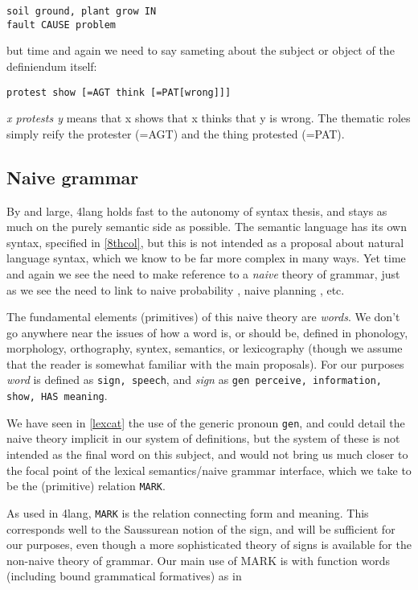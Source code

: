\documentclass[11pt,bookmarks,bookmarksnumbered,naturalnames,plainpages=false,pdftex,colorlinks=true,urlcolor=blue,bookmarksdepth=subsection,plainpages=false]{paper}
\begin{document}
\begin{verbatim}
soil ground, plant grow IN
fault CAUSE problem
\end{verbatim}

\noindent
but time and again we need to say sameting about the subject or object of the
definiendum itself: 

\begin{verbatim}
protest show [=AGT think [=PAT[wrong]]]
\end{verbatim}

\noindent
{\it x protests y} means that x shows that x thinks that y is wrong. The
thematic roles simply reify the protester (=AGT) and the thing protested
(=PAT). 

\subsection{Naive grammar}\label{naivegrammar}

By and large, 4lang holds fast to the autonomy of syntax thesis, and stays as
much on the purely semantic side as possible. The semantic language has its
own syntax, specified in \ref{8thcol}, but this is not intended as a proposal
about natural language syntax, which we know to be far more complex in many
ways. Yet time and again we see the need to make reference to a {\it naive}
theory of grammar, just as we see the need to link to naive probability
\citep{Gyenis:2019}, naive planning \citep{Gordon:2017}, etc. 

The fundamental elements (primitives) of this naive theory are {\it words}. We
don't go anywhere near the issues of how a word is, or should be, defined in
phonology, morphology, orthography, syntex, semantics, or lexicography (though
we assume that the reader is somewhat familiar with the main proposals). For
our purposes {\it word} is defined as {\tt sign, speech}, and {\it sign} as
{\tt gen perceive, information, show, HAS meaning}.

We have seen in \ref{lexcat} the use of the generic pronoun {\tt gen}, and
could detail the naive theory implicit in our system of definitions, but the
system of these is not intended as the final word on this subject, and would
not bring us much closer to the focal point of the lexical semantics/naive
grammar interface, which we take to be the (primitive) relation {\tt MARK}.

As used in 4lang, {\tt MARK} is the relation connecting form and meaning. This
corresponds well to the Saussurean notion of the sign, and will be sufficient
for our purposes, even though a more sophisticated theory of signs
\citep{Kracht:2011} is available for the non-naive theory of grammar. Our main
use of MARK is with function words (including bound grammatical formatives) as
in
\end{document}
